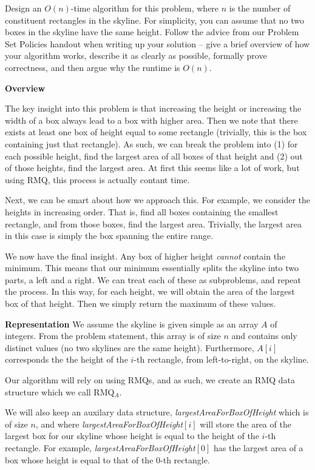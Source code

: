 \documentclass[12pt]{exam}
\newcommand*{\bigo}[1]{O \left( #1 \right)}
\begin{document}
\begin{questions}
Design an $\bigo{n}$-time algorithm for this problem, where $n$ is the number of constituent rectangles in the skyline. For simplicity, you can assume that no two boxes in the skyline have the same height. Follow the advice from our Problem Set Policies handout when writing up your solution -- give a brief overview of how your algorithm works, describe it as clearly as possible, formally prove correctness, and then argue why the runtime is $\bigo{n}$.

\begin{solution}
\textbf{Overview}

The key insight into this problem is that increasing the height or increasing the width of a box always lead to a box with higher area. Then we note that there exists at least one box of height equal to some rectangle (trivially, this is the box containing just that rectangle). As such, we can break the problem into (1) for each possible height, find the largest area of all boxes of that height and (2) out of those heights, find the largest area. At first this seems like a lot of work, but using RMQ, this process is actually contant time.

Next, we can be smart about how we approach this. For example, we consider the heights in increasing order. That is, find all boxes containing the smallest rectangle, and from those boxes, find the largest area. Trivially, the largest area in this case is simply the box spanning the entire range.

We now have the final insight. Any box of higher height \textit{cannot} contain the minimum. This means that our minimum essentially splits the skyline into two parts, a left and a right. We can treat each of these as subproblems, and repeat the process. In this way, for each height, we will obtain the area of the largest box of that height. Then we simply return the maximum of these values.

\textbf{Representation}
We assume the skyline is given simple as an array $A$ of integers. From the problem statement, this array is of size $n$ and contains only distinct values (no two skylines are the same height). Furthermore, $A[i]$ corresponds the the height of the $i$-th rectangle, from left-to-right, on the skyline.

Our algorithm will rely on using RMQs, and as such, we create an RMQ data structure which we call RMQ$_A$.

We will also keep an auxilary data structure, \textit{largestAreaForBoxOfHeight} which is of size $n$, and where \textit{largestAreaForBoxOfHeight}$[i]$ will store the area of the largest box for our skyline whose height is equal to the height of the $i$-th rectangle. For example, \textit{largestAreaForBoxOfHeight}$[0]$ has the largest area of a box whose height is equal to that of the $0$-th rectangle. 


\end{solution}
\end{questions}
\end{document}
